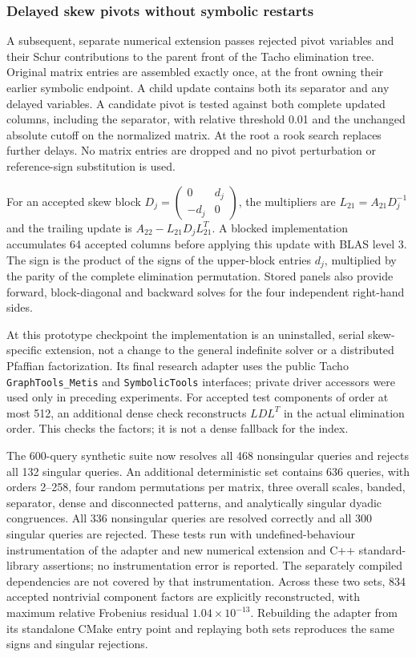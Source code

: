\documentclass[11pt]{article}
\begin{document}
\subsubsection{Delayed skew pivots without symbolic restarts}
A subsequent, separate numerical extension passes rejected pivot variables
and their Schur contributions to the parent front of the Tacho elimination
tree. Original matrix entries are assembled exactly once, at the front
owning their earlier symbolic endpoint. A child update contains both its
separator and any delayed variables. A candidate pivot is tested against
both complete updated columns, including the separator, with relative
threshold 0.01 and the unchanged absolute cutoff on the normalized matrix.
At the root a rook search replaces further delays. No matrix entries are
dropped and no pivot perturbation or reference-sign substitution is used.

For an accepted skew block
$D_j=\left(\begin{smallmatrix}0&d_j\\-d_j&0\end{smallmatrix}\right)$,
the multipliers are $L_{21}=A_{21}D_j^{-1}$ and the trailing update is
$A_{22}-L_{21}D_jL_{21}^T$.
A blocked implementation accumulates 64 accepted columns before applying
this update with BLAS level 3. The sign is the product of the signs of
the upper-block entries $d_j$, multiplied by the parity of the complete
elimination permutation. Stored panels also provide forward, block-diagonal
and backward solves for the four independent right-hand sides.

At this prototype checkpoint the implementation is an uninstalled,
serial skew-specific extension,
not a change to the general indefinite solver or a distributed Pfaffian
factorization. Its final research adapter uses the public Tacho
\texttt{GraphTools\_Metis} and \texttt{SymbolicTools} interfaces;
private driver accessors were used only in preceding experiments.
For accepted test components of order at most 512, an additional dense
check reconstructs $LDL^T$ in the actual elimination order. This checks
the factors; it is not a dense fallback for the index.

The 600-query synthetic suite now resolves all 468 nonsingular queries
and rejects all 132 singular queries. An additional deterministic set
contains 636 queries, with orders 2--258, four random permutations per
matrix, three overall scales, banded, separator, dense and disconnected
patterns, and analytically singular dyadic congruences. All 336 nonsingular
queries are resolved correctly and all 300 singular queries are rejected.
These tests run with undefined-behaviour instrumentation of the adapter
and new numerical extension and C++ standard-library assertions; no
instrumentation error is reported. The separately compiled dependencies
are not covered by that instrumentation.
Across these two sets, 834 accepted nontrivial component factors are
explicitly reconstructed, with maximum relative Frobenius residual
$1.04\times10^{-13}$. Rebuilding the adapter from its standalone CMake
entry point and replaying both sets reproduces the same signs and
singular rejections.
\end{document}
